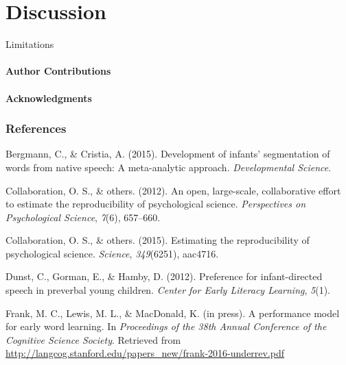 \documentclass[english,floatsintext,man]{apa6}
\newcounter{author}
\begin{document}
\section{Discussion}\label{discussion}

Limitations

\paragraph{Author Contributions}\label{author-contributions}

\paragraph{Acknowledgments}\label{acknowledgments}

\newpage

\subsubsection{References}\label{references}

\setlength{\parindent}{-0.5in} \setlength{\leftskip}{0.5in}
\setlength{\parskip}{8pt}

\hypertarget{refs}{}
\hypertarget{ref-bergmann2015development}{}
Bergmann, C., \& Cristia, A. (2015). Development of infants'
segmentation of words from native speech: A meta-analytic approach.
\emph{Developmental Science}.

\hypertarget{ref-open2012open}{}
Collaboration, O. S., \& others. (2012). An open, large-scale,
collaborative effort to estimate the reproducibility of psychological
science. \emph{Perspectives on Psychological Science}, \emph{7}(6),
657--660.

\hypertarget{ref-open2015estimating}{}
Collaboration, O. S., \& others. (2015). Estimating the reproducibility
of psychological science. \emph{Science}, \emph{349}(6251), aac4716.

\hypertarget{ref-dunst2012preference}{}
Dunst, C., Gorman, E., \& Hamby, D. (2012). Preference for
infant-directed speech in preverbal young children. \emph{Center for
Early Literacy Learning}, \emph{5}(1).

\hypertarget{ref-frank2016performance}{}
Frank, M. C., Lewis, M. L., \& MacDonald, K. (in press). A performance
model for early word learning. In \emph{Proceedings of the 38th Annual
Conference of the Cognitive Science Society}. Retrieved from
\url{http://langcog.stanford.edu/papers_new/frank-2016-underrev.pdf}
\end{document}
